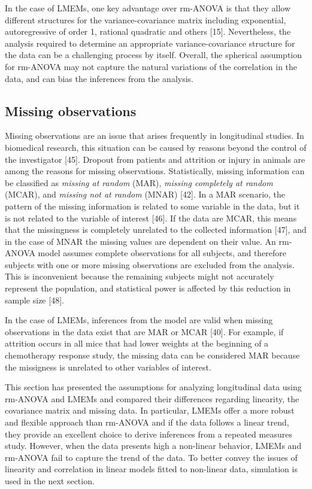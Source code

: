 \documentclass[
]{article}
\begin{document}
In the case of LMEMs, one key advantage over rm-ANOVA is that they allow different structures for the variance-covariance matrix including exponential, autoregressive of order 1, rational quadratic and others {[}15{]}. Nevertheless, the analysis required to determine an appropriate variance-covariance structure for the data can be a challenging process by itself. Overall, the spherical assumption for rm-ANOVA may not capture the natural variations of the correlation in the data, and can bias the inferences from the analysis.

\hypertarget{missing-observations}{%
\subsection{Missing observations}\label{missing-observations}}

Missing observations are an issue that arises frequently in longitudinal studies. In biomedical research, this situation can be caused by reasons beyond the control of the investigator {[}45{]}. Dropout from patients and attrition or injury in animals are among the reasons for missing observations. Statistically, missing information can be classified as \emph{missing at random} (MAR), \emph{missing completely at random} (MCAR), and \emph{missing not at random} (MNAR) {[}42{]}. In a MAR scenario, the pattern of the missing information is related to some variable in the data, but it is not related to the variable of interest {[}46{]}. If the data are MCAR, this means that the missingness is completely unrelated to the collected information {[}47{]}, and in the case of MNAR the missing values are dependent on their value. An rm-ANOVA model assumes complete observations for all subjects, and therefore subjects with one or more missing observations are excluded from the analysis. This is inconvenient because the remaining subjects might not accurately represent the population, and statistical power is affected by this reduction in sample size {[}48{]}.

In the case of LMEMs, inferences from the model are valid when missing observations in the data exist that are MAR or MCAR {[}40{]}. For example, if attrition occurs in all mice that had lower weights at the beginning of a chemotherapy response study, the missing data can be considered MAR because the missigness is unrelated to other variables of interest.

This section has presented the assumptions for analyzing longitudinal data using rm-ANOVA and LMEMs and compared their differences regarding linearity, the covariance matrix and missing data. In particular, LMEMs offer a more robust and flexible approach than rm-ANOVA and if the data follows a linear trend, they provide an excellent choice to derive inferences from a repeated measures study. However, when the data presents high a non-linear behavior, LMEMs and rm-ANOVA fail to capture the trend of the data. To better convey the issues of linearity and correlation in linear models fitted to non-linear data, simulation is used in the next section.
\end{document}
